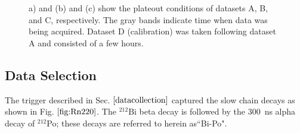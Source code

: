 \begin{figure}[hbtp]
\caption{a) and (b) and (c) show the plateout conditions of datasets A, B, and C, respectively. The gray bands indicate time when data was being acquired. Dataset D (calibration) was taken following dataset A and consisted of a few hours.}
\label{fig:plate_out}
\end{figure}





\subsection{Data Selection}
The trigger described in Sec. $\ref{datacollection}$ captured the slow chain decays as shown in Fig. $\ref{fig:Rn220}$. The $^{212}$Bi beta decay is followed by the 300~ns alpha decay of $^{212}$Po; these decays are referred to herein as``Bi-Po".



